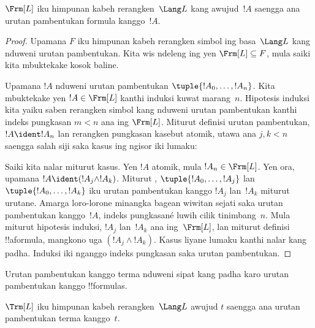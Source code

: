 \documentclass[../../../include/open-logic-section]{subfiles}
\begin{document}
\begin{thm}
$\Frm[L]$ iku himpunan kabeh rerangken~$\Lang L$ kang awujud~$!A$
saengga ana urutan pambentukan formula kanggo~$!A$.
\end{thm}

\begin{proof}
Upamana $F$ iku himpunan kabeh rerangken simbol ing basa~$\Lang L$
kang nduweni urutan pambentukan. Kita wis ndeleng ing
 yen $\Frm[L] \subseteq F$,
mula saiki kita mbuktekake kosok baline.

Upamana $!A$ nduweni urutan pambentukan
$\tuple{!A_0,\dotsc,!A_n}$. Kita mbuktekake yen
$!A \in \Frm[L]$ kanthi induksi kuwat marang~$n$.
Hipotesis induksi kita yaiku saben rerangken simbol kang nduweni
urutan pambentukan kanthi indeks pungkasan $m < n$ ana ing
$\Frm[L]$. Miturut definisi urutan pambentukan,
$!A \ident !A_n$ lan rerangken pungkasan kasebut atomik,
utawa ana $j,k < n$
saengga salah siji saka kasus ing ngisor iki lumaku:
\begin{enumerate}
\end{enumerate}
Saiki kita nalar miturut kasus. Yen $!A$ atomik, mula
$!A_n \in \Frm[L]$. Yen ora, upamana
$!A \ident (!A_j \land !A_k)$. Miturut
,
$\tuple{!A_0,\dotsc,!A_j}$ lan $\tuple{!A_0,\dotsc,!A_k}$
iku urutan pambentukan kanggo $!A_j$ lan~$!A_k$ miturut urutane.
Amarga loro-lorone minangka bagean wiwitan sejati saka urutan
pambentukan kanggo~$!A$, indeks pungkasané luwih cilik tinimbang~$n$.
Mula miturut hipotesis induksi, $!A_j$ lan~$!A_k$ ana ing~$\Frm[L]$,
lan miturut definisi !!a{formula}, mangkono uga
$(!A_j \land !A_k)$. Kasus liyane lumaku kanthi nalar kang padha.
Induksi iki nganggo indeks pungkasan saka urutan pambentukan.
\end{proof}

Urutan pambentukan kanggo terma nduweni sipat kang padha karo urutan
pambentukan kanggo !!{formula}s.

\begin{prop}
$\Trm[L]$ iku himpunan kabeh rerangken~$\Lang L$ awujud $t$
saengga ana urutan pambentukan terma kanggo~$t$.
\end{prop}
\end{document}
